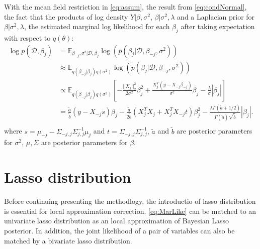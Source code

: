 With the mean field restriction in \autoref{eq:assum}, the result from \autoref{eq:condNormal}, the fact that the products of log density $Y|\beta,\sigma^2$, $\beta|\sigma^2,\lambda$ and a Laplacian prior for $\beta|\sigma^2,\lambda$, the estimated marginal log likelihood for each $\beta_j$ after taking expectation with respect to $q(\theta)$:
\begin{equation}
	\label{eq:MarLike}
	\begin{aligned}
		\log p(\mathcal{D},\beta_j) &= \mathbb{E}_{\beta_{-j},\sigma^2|\mathcal{D},\beta_j} 	\log(p(\beta_j|\mathcal{D},\beta_{-j},\sigma^2))\\
		& \approx \mathbb{E}_{q(\beta_{-j}|\beta_j)q(\sigma^2)}
		 \log(p(\beta_j|\mathcal{D},\beta_{-j},\sigma^2))\\
		& \propto \mathbb{E}_{q(\beta_{-j}|\beta_j)q(\sigma^2)}[-\frac{||X_j||_2^2}{2\sigma^2}\beta_j^2 + \frac{X_j^T(y - X_{-j}\beta_{-j})}{\sigma^2}\beta_j - \frac{\lambda}{\sigma}|\beta_j|]\\
		&= \frac{\tilde{a}}{\tilde{b}}(y - X_{-j}s)\beta_j - \frac{\tilde{a}}{2\tilde{b}}(X_j^TX_j+X_j^TX_{-j}t)\beta_j^2 - \frac{\lambda \Gamma(\tilde{a}+1/2)}{\Gamma(\tilde{a})\sqrt{\tilde{b}}}|\beta_j|.\\
	\end{aligned}
\end{equation}
where $s = \mu_{-j} - \Sigma_{-j,j}\Sigma_{j,j}^{-1}\mu_j$ and $t = \Sigma_{-j,j}\Sigma_{j,j}^{-1}$, $\tilde{a}$ and $\tilde{b}$ are posterior parameters for $\sigma^2$, $\mu,\Sigma$ are posterior parameters for $\beta$.

\section{Lasso distribution}
Before continuing presenting the methodlogy, the introductio of lasso distribution is essential for local approximation correction.
\autoref{eq:MarLike} can be matched to an univariate lasso distribution as an local approximation of Bayesian Lasso posterior. In addition, the joint likelihood of a pair of variables can also be matched by a bivariate lasso distribution.
         
